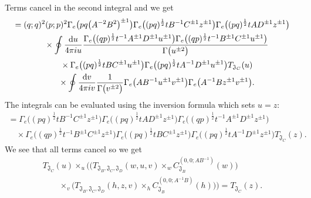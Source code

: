 \documentclass[a4paper,12pt]{article}
\begin{document}
Terms cancel in the second integral and we get
\begin{gather*}
=(q;q)^2(p;p)^2\Gamma_e\big(pq\big(A^{-2}B^2\big)^{\pm1}\big)\Gamma_e\big((pq)^\frac12 t B^{-1} C^{\pm1}z^{\pm1}\big)
\Gamma_e\big((pq)^\frac12 t AD^{\pm1}z^{\pm1}\big)\\
\quad{}\times\oint\frac{{\rm d}u}{4\pi i u} \frac{\Gamma_e\big((q p)^{\frac12 }t^{-1} A^{\pm1} D^{\pm1}u^{\pm1}\big)
\Gamma_e\big((q p)^{\frac12 }t^{-1} B^{\pm1} C^{\pm1}u^{\pm1}\big)}{\Gamma\big(u^{\pm2}\big)}\\
\quad{}\times\Gamma_e\big((pq)^\frac12 t B C^{\pm1}u^{\pm1}\big)\Gamma_e\big((pq)^\frac12 t A^{-1}D^{\pm1}u^{\pm1}\big)T_{{\mathfrak J}_C}(u)\\
\quad{}\times\oint\frac{{\rm d}v}{4\pi i v} \frac{1}{\Gamma\big(v^{\pm2}\big)}
\Gamma_e\big( AB^{-1} u^{\pm1} v^{\pm1}\big) \Gamma_e\big( A^{-1}B z^{\pm1} v^{\pm1}\big) .
\end{gather*}
The integrals can be evaluated using the inversion formula which sets $u=z$:
\begin{gather*}
=\Gamma_e\big((pq)^\frac12 t B^{-1} C^{\pm1}z^{\pm1}\big)
\Gamma_e\big((pq)^\frac12 t AD^{\pm1}z^{\pm1}\big)\Gamma_e\big((q p)^{\frac12 }t^{-1} A^{\pm1} D^{\pm1}z^{\pm1}\big)\\
\quad{} \times\Gamma_e\big((q p)^{\frac12 }t^{-1} B^{\pm1} C^{\pm1}z^{\pm1}\big)\Gamma_e\big((pq)^\frac12 t B C^{\pm1}z^{\pm1}\big)
\Gamma_e\big((pq)^\frac12 t A^{-1}D^{\pm1}z^{\pm1}\big)T_{{\mathfrak J}_C}(z) .
\end{gather*}
We see that all terms cancel so we get
\begin{gather*}
 T_{{\mathfrak J}_C}(u)\times_u \big(\big(T_{{\mathfrak J}_B, {\mathfrak J}_C,{\mathfrak J}_D}(w,u,v)\times_w C^{(0,0;AB^{-1})}_{{\mathfrak J}_B}(w)\big)\\
\qquad{} \times_v\big(T_{{\mathfrak J}_B, {\mathfrak J}_C,{\mathfrak J}_D}(h,z,v)\times_h C^{(0,0;A^{-1}B)}_{{\mathfrak J}_B}(h)\big)\big)= T_{{\mathfrak J}_C}(z).
\end{gather*}
\end{document}
